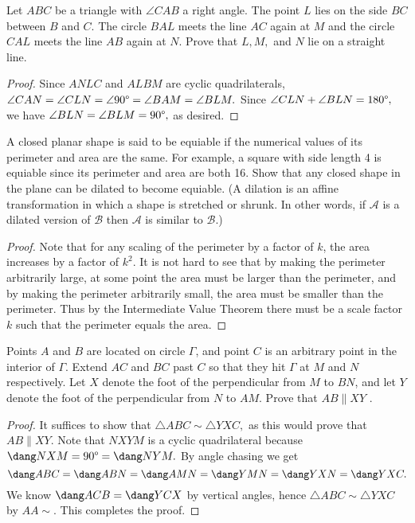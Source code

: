 \documentclass[letterpaper,oneside]{scrartcl}
\begin{document}
\begin{problem*}
  Let $ABC$ be a triangle with $\angle CAB$ a right angle. The point $L$ lies on the side $BC$ between $B$ and $C$. The circle $BAL$ meets the line $AC$ again at $M$ and the circle $CAL$ meets the line $AB$ again at $N.$ Prove that $L, M,$ and $N$ lie on a straight line.
\end{problem*}
\begin{proof}
  Since $ANLC$ and $ALBM$ are cyclic quadrilaterals, $\angle CAN = \angle CLN = \angle 90\degree = \angle BAM = \angle BLM.$ Since $\angle CLN + \angle BLN = 180\degree,$ we have $\angle BLN = \angle BLM = 90\degree,$ as desired.
\end{proof}
\begin{problem*}
  A closed planar shape is said to be equiable if the numerical values of its perimeter and area are the same. For example, a square with side length 4 is equiable since its perimeter and area are both 16. Show that any closed shape in the plane can be dilated to become equiable. (A dilation is an affine transformation in which a shape is stretched or shrunk. In other words, if $\mathcal{A}$ is a dilated version of $\mathcal{B}$ then $\mathcal{A}$ is similar to $\mathcal{B}$.) 
\end{problem*}
\begin{proof}
  Note that for any scaling of the perimeter by a factor of $k$, the area increases by a factor of $k^2.$ It is not hard to see that by making the perimeter arbitrarily large, at some point the area must be larger than the perimeter, and by making the perimeter arbitrarily small, the area must be smaller than the perimeter. Thus by the Intermediate Value Theorem there must be a scale factor $k$ such that the perimeter equals the area. 
\end{proof}
\begin{problem*}
  Points $A$ and $B$ are located on circle $\Gamma$, and point $C$ is an arbitrary point in the interior of $\Gamma$. Extend $AC$ and $BC$ past $C$ so that they hit $\Gamma$ at $M$ and $N$ respectively. Let $X$ denote the foot of the perpendicular from $M$ to $BN$, and let $Y$ denote the foot of the perpendicular from $N$ to $AM$. Prove that $AB \parallel XY$ . 
\end{problem*}
\begin{proof}
  It suffices to show that $\triangle ABC \sim \triangle YXC,$ as this would prove that $AB \parallel XY.$ Note that $NXYM$ is a cyclic quadrilateral because $\dang NXM = 90\degree = \dang NYM.$ By angle chasing we get
  $$\dang ABC = \dang ABN = \dang AMN  = \dang YMN = \dang YXN = \dang YXC.$$
  We know $\dang ACB = \dang YCX$ by vertical angles, hence $\triangle ABC \sim \triangle YXC$ by $AA\sim.$ This completes the proof.
\end{proof}
\end{document}
